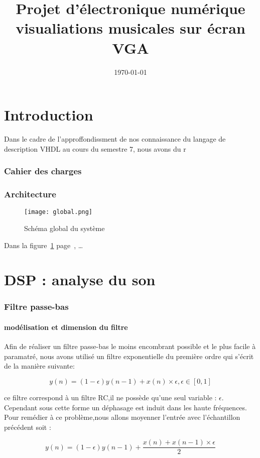 \documentclass{article}
\title{%
	Projet d'électronique numérique \\
	\large{visualiations musicales sur écran VGA}}
\date\today
\author{
	\bsc{LESTANDI Nathan}
	\and
	\bsc{ECOCHARD Florent}
}
\begin{document}
    \maketitle
    \newpage
    \tableofcontents
    \newpage
    \part*{Introduction}
    Dans le cadre de l'approffondissment de nos connaissance du langage de description VHDL au cours du semestre 7, nous avons du r
    \section{Cahier des charges}
    
    
    
    \section{Architecture}
    \begin{figure}[h]
    \texttt{[image: global.png]}
    \caption{\label{global} Schéma global du système}
    \end{figure}
    Dans la figure~\ref{global} page~\pageref{global}, …
    \newpage
    \part{DSP : analyse du son}
    \section{Filtre passe-bas}
    \subsection{modélisation et dimension du filtre}
    Afin de réaliser un filtre passe-bas le moins encombrant possible et le plus facile à paramatré, nous avons utilisé un filtre exponentielle du première ordre qui s'écrit de la manière suivante: 
	\begin{center}
		\begin{equation}
			y(n)=(1-\epsilon)y(n-1)+x(n)\times\epsilon ,\epsilon \in [0,1]
		\end{equation}
	\end{center}    
    ce filtre correspond à un filtre RC,il ne possède qu'une seul variable : $\epsilon$.\\ Cependant sous cette forme un déphasage est induit dans les haute fréquences. Pour remédier à ce problème,nous allons moyenner l'entrée avec l'échantillon précédent soit :
	\begin{center}
		\begin{equation}
			y(n)=(1-\epsilon)y(n-1)+\frac{x(n)+x(n-1)\times\epsilon}{2}
		\end{equation}
	\end{center}  
    
\end{document}
